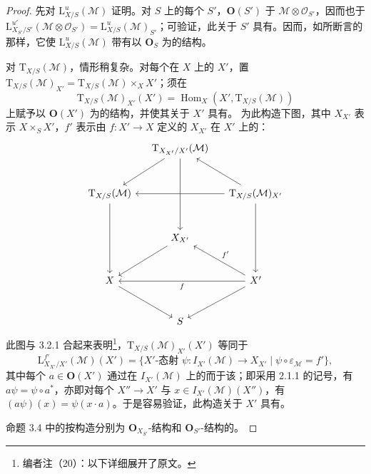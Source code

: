 \begin{proof}
先对 $\mathrm L^u_{X/S}(\mathcal M)$ 证明。对 $S$ 上的每个 $S'$，$\mathbf O(S')$ 于 $\mathcal M\otimes\mathcal O_{S'}$，因而也于 $\mathrm L^{u'}_{X_{S'}/S'}(\mathcal M\otimes\mathcal O_{S'})=\mathrm L^u_{X/S}(\mathcal M)_{S'}$；可验证，此关于 $S'$ 具有。因而，如所断言的那样，它使 $\mathrm L^u_{X/S}(\mathcal M)$ 带有以 $\mathbf O_S$ 为的结构。

对 $\mathrm T_{X/S}(\mathcal M)$，情形稍复杂。对每个在 $X$ 上的 $X'$，置 $\mathrm T_{X/S}(\mathcal M)_{X'}=\mathrm T_{X/S}(\mathcal M)\times_X X'$；须在
\[
\mathrm T_{X/S}(\mathcal M)_{X'}(X')=\operatorname{Hom}_X(X',\mathrm T_{X/S}(\mathcal M))
\]
上赋予以 $\mathbf O(X')$ 为的结构，并使其关于 $X'$ 具有。
为此构造下图，其中 $X_{X'}$ 表示 $X\times_S X'$，$f'$ 表示由 $f:X'\to X$ 定义的 $X_{X'}$ 在 $X'$ 上的：
\[
\begin{tikzcd}[column sep=small,row sep=large]
&\mathrm T_{X_{X'}/X'}(\mathcal M)\arrow[dl]\arrow[dd] &\\
\mathrm T_{X/S}(\mathcal M)\arrow[dd]&&\mathrm T_{X/S}(\mathcal M)_{X'}\arrow[ul]\arrow[ll]\arrow[dd]\\
&X_{X'}\arrow[dl]&\\
X\arrow[dr]&&X'\arrow[ul,"f'"']\arrow[ll,"f"]\arrow[dl]\\
&S&
\end{tikzcd}
\]
此图与 3.2.1 合起来表明\footnote{编者注（20）：以下详细展开了原文。}，$\mathrm T_{X/S}(\mathcal M)_{X'}(X')$ 等同于
\[
\mathrm L^{f'}_{X_{X'}/X'}(\mathcal M)(X')
=\{\text{$X'$-态射 }\psi:I_{X'}(\mathcal M)\to X_{X'}\mid\psi\circ\varepsilon_{\mathcal M}=f'\},
\]
其中每个 $a\in\mathbf O(X')$ 通过在 $I_{X'}(\mathcal M)$ 上的而于该；即采用 2.1.1 的记号，有 $a\psi=\psi\circ a^*$，亦即对每个 $X''\to X'$ 与 $x\in I_{X'}(\mathcal M)(X'')$，有 $(a\psi)(x)=\psi(x\cdot a)$。于是容易验证，此构造关于 $X'$ 具有。

命题 3.4 中的按构造分别为 $\mathbf O_{X_{S'}}$-结构和 $\mathbf O_{S'}$-结构的。
\end{proof}
